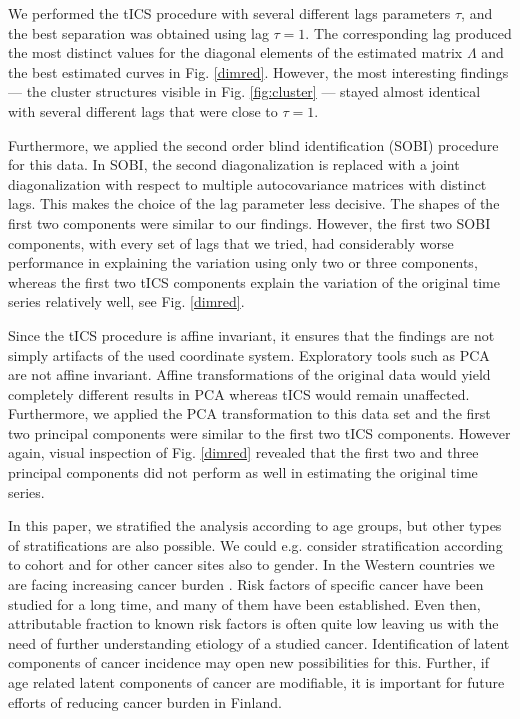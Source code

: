 \documentclass{llncs}
\begin{document}
We performed the tICS procedure with several different lags parameters $\tau$, and the best separation was obtained using lag $\tau=1$. The corresponding lag produced the most distinct values for the diagonal elements of the estimated matrix $\Lambda$ and the best estimated curves in Fig. \ref{dimred}. However, the most interesting findings --- the cluster structures visible in Fig. \ref{fig:cluster} --- stayed almost identical with several different lags that were close to $\tau=1$. 

Furthermore, we applied the second order blind identification (SOBI) \cite{belouchrani1997} procedure for this data. In SOBI, the second diagonalization is replaced with a joint diagonalization with respect to multiple autocovariance matrices with distinct lags. This makes the choice of the lag parameter less decisive. The shapes of the first two components were similar to our findings. However, the first two SOBI components, with every set of lags that we tried, had considerably worse performance in explaining the variation using only two or three components, whereas the first two tICS components explain the variation of the original time series relatively well, see Fig. \ref{dimred}.



Since the  tICS procedure is affine invariant, it ensures that the findings are not simply artifacts of the used coordinate system. Exploratory tools such as PCA are not affine invariant.
Affine transformations of the original data would yield completely different results in PCA whereas tICS would remain unaffected. Furthermore, we applied the PCA transformation to this data set and the first two principal components were similar to the first two tICS components. However again, visual inspection of Fig. \ref{dimred} revealed that the first two and three principal components did not perform as well in estimating the original time series. 

In this paper, we  stratified the analysis according to age groups, but other types of stratifications are also possible. We could e.g. consider stratification according to cohort and for other cancer sites also to gender. In the Western countries we are facing increasing cancer burden \cite{parkin2011}. Risk factors of  specific cancer have been studied for a long time, and many of them have been established. Even then, attributable fraction to known risk factors is often quite low leaving us with the need of further understanding etiology of a studied cancer. Identification of latent components of cancer incidence may open new possibilities for this. Further, if age related latent components of cancer are modifiable, it is important for future efforts of reducing cancer burden in Finland. 







\end{document}

